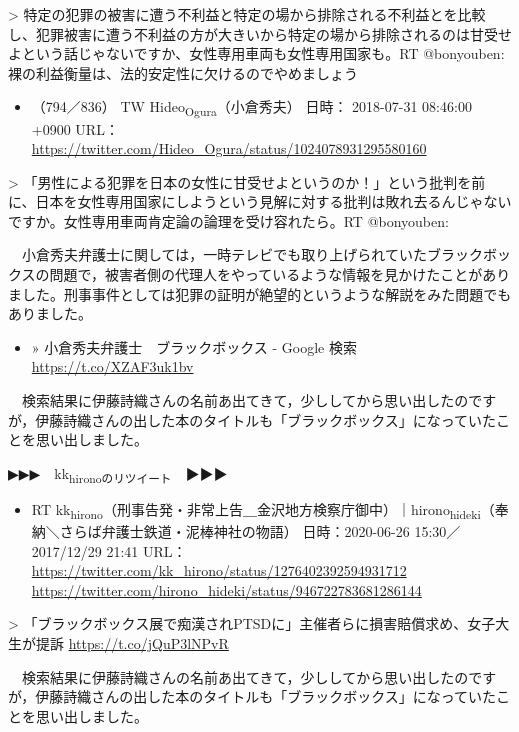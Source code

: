 \documentclass[]{ltjarticle}
\begin{document}
> 特定の犯罪の被害に遭う不利益と特定の場から排除される不利益とを比較し、犯罪被害に遭う不利益の方が大きいから特定の場から排除されるのは甘受せよという話じゃないですか、女性専用車両も女性専用国家も。RT @bonyouben: 裸の利益衡量は、法的安定性に欠けるのでやめましょう

\begin{itemize}
\item （794／836） TW Hideo\textsubscript{Ogura}（小倉秀夫） 日時： 2018-07-31 08:46:00 +0900 URL： \url{https://twitter.com/Hideo\_Ogura/status/1024078931295580160}
\end{itemize}

> 「男性による犯罪を日本の女性に甘受せよというのか！」という批判を前に、日本を女性専用国家にしようという見解に対する批判は敗れ去るんじゃないですか。女性専用車両肯定論の論理を受け容れたら。RT @bonyouben:

　小倉秀夫弁護士に関しては，一時テレビでも取り上げられていたブラックボックスの問題で，被害者側の代理人をやっているような情報を見かけたことがありました。刑事事件としては犯罪の証明が絶望的というような解説をみた問題でもありました。

\begin{itemize}
\item » 小倉秀夫弁護士　ブラックボックス - Google 検索 \url{https://t.co/XZAF3uk1bv}
\end{itemize}

　検索結果に伊藤詩織さんの名前あ出てきて，少ししてから思い出したのですが，伊藤詩織さんの出した本のタイトルも「ブラックボックス」になっていたことを思い出しました。

▶▶▶　kk\textsubscript{hironoのリツイート}　▶▶▶  

\begin{itemize}
\item RT kk\textsubscript{hirono}（刑事告発・非常上告＿金沢地方検察庁御中）｜hirono\textsubscript{hideki}（奉納＼さらば弁護士鉄道・泥棒神社の物語） 日時：2020-06-26 15:30／2017/12/29 21:41 URL： \url{https://twitter.com/kk\_hirono/status/1276402392594931712} \url{https://twitter.com/hirono\_hideki/status/946722783681286144}
\end{itemize}

> 「ブラックボックス展で痴漢されPTSDに」主催者らに損害賠償求め、女子大生が提訴 \url{https://t.co/jQuP3lNPvR}  

　検索結果に伊藤詩織さんの名前あ出てきて，少ししてから思い出したのですが，伊藤詩織さんの出した本のタイトルも「ブラックボックス」になっていたことを思い出しました。
\end{document}
